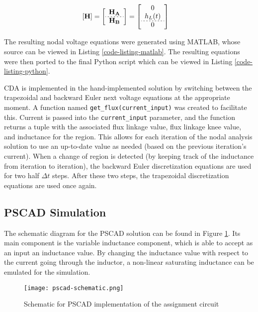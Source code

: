 \documentclass[10pt, oneside, letterpaper]{article}
\begin{document}
\begin{alignat}{2}
    \left[
        \mathbf{H}
    \right] &= \left[
        \begin{array}{c}
            \mathbf{H_{A}} \\
            \hdashline[2pt/2pt] \mathbf{H_{B}}
        \end{array}\right] = \left[
        \begin{array}{c}
            0 \\
            h_{L}(t) \\
            \hdashline[2pt/2pt] 0 \end{array}\right]
\end{alignat}

The resulting nodal voltage equations were generated using MATLAB, whose source can be viewed in Listing \ref{code-listing-matlab}. The resulting equations were then ported to the final Python script which can be viewed in Listing \ref{code-listing-python}.

CDA is implemented in the hand-implemented solution by switching between the trapezoidal and backward Euler next voltage equations at the appropriate moment. A function named \texttt{get\_flux(current\_input)} was created to facilitate this. Current is passed into the \texttt{current\_input} parameter, and the function returns a tuple with the associated flux linkage value, flux linkage knee value, and inductance for the region. This allows for each iteration of the nodal analysis solution to use an up-to-date value as needed (based on the previous iteration's current). When a change of region is detected (by keeping track of the inductance from iteration to iteration), the backward Euler discretization equations are used for two half $\Delta{}t$ steps. After these two steps, the trapezoidal discretization equations are used once again.

\subsection{PSCAD Simulation}

The schematic diagram for the PSCAD solution can be found in Figure \ref{pscad-schematic}. Its main component is the variable inductance component, which is able to accept as an input an inductance value. By changing the inductance value with respect to the current going through the inductor, a non-linear saturating inductance can be emulated for the simulation.

\begin{figure}[H]
  \centering
  \texttt{[image: pscad-schematic.png]}
  \caption{Schematic for PSCAD implementation of the assignment circuit}
  \label{pscad-schematic}
\end{figure}
\end{document}
